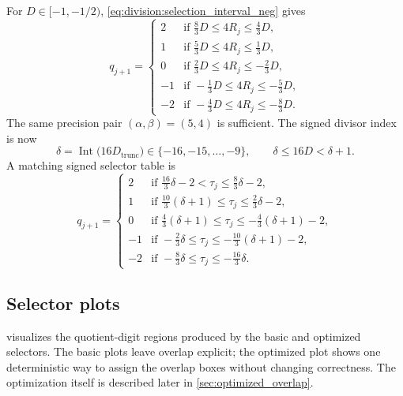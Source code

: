 \documentclass[11pt]{article}
\DeclareMathOperator{\Int}{Int}
\numberwithin{equation}{section}
\begin{document}
For $D \in [-1,-1/2)$, \cref{eq:division:selection_interval_neg} gives
\begin{equation}
  \label{eq:division:radix4_intervals_neg}
  q_{j+1} =
  \begin{cases}
    2  & \text{if } \frac{8}{3}D \le 4R_j \le \frac{4}{3}D, \\
    1  & \text{if } \frac{5}{3}D \le 4R_j \le \frac{1}{3}D, \\
    0  & \text{if } \frac{2}{3}D \le 4R_j \le -\frac{2}{3}D, \\
    -1 & \text{if } -\frac{1}{3}D \le 4R_j \le -\frac{5}{3}D, \\
    -2 & \text{if } -\frac{4}{3}D \le 4R_j \le -\frac{8}{3}D.
  \end{cases}
\end{equation}
The same precision pair $(\alpha,\beta)=(5,4)$ is sufficient.
The signed divisor index is now
\begin{equation}
  \label{eq:division:radix4_delta_val_neg}
  \delta = \Int\bigl(16D_{\text{trunc}}\bigr) \in \{-16,-15,\dotsc,-9\},
  \qquad
  \delta \le 16D < \delta+1.
\end{equation}
A matching signed selector table is
\begin{equation}
  \label{eq:division:radix4_logic_neg}
  q_{j+1} =
  \begin{cases}
    2  & \text{if } \frac{16}{3}\delta - 2 < \tau_j \le \frac{8}{3}\delta - 2, \\
    1  & \text{if } \frac{10}{3}(\delta+1) \le \tau_j \le \frac{2}{3}\delta - 2, \\
    0  & \text{if } \frac{4}{3}(\delta+1) \le \tau_j \le -\frac{4}{3}(\delta+1) - 2, \\
    -1 & \text{if } -\frac{2}{3}\delta \le \tau_j \le -\frac{10}{3}(\delta+1) - 2, \\
    -2 & \text{if } -\frac{8}{3}\delta \le \tau_j \le -\frac{16}{3}\delta.
  \end{cases}
\end{equation}

\subsection{Selector plots}
\label{ssec:division:figures}

 visualizes the quotient-digit regions produced by the basic and optimized
selectors.
The basic plots leave overlap explicit; the optimized plot shows one deterministic way to assign the
overlap boxes without changing correctness.
The optimization itself is described later in \cref{sec:optimized_overlap}.
\end{document}
